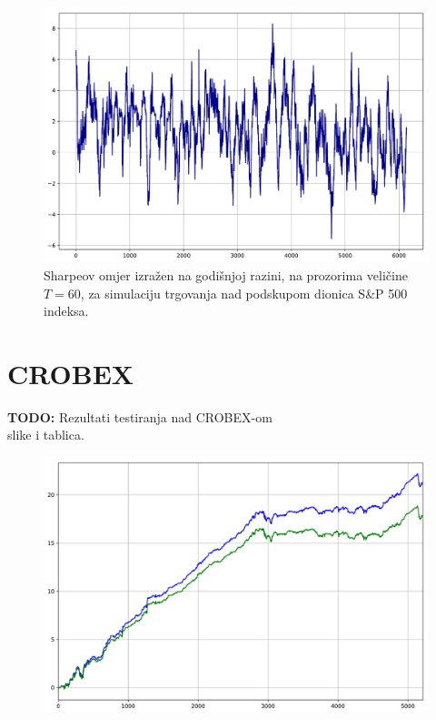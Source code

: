 \documentclass[lmodern, utf8, diplomski, numeric]{fer}
\newcommand{\todo}{\textbf{TODO: }}
\begin{document}
  \begin{figure}[p]
    \centering
    \includegraphics[width=\linewidth]{graphics/sharpe1.pdf}
    \caption{Sharpeov omjer izražen na godišnjoj razini, na prozorima veličine $T = 60$, za simulaciju trgovanja nad podskupom dionica S\&P 500 indeksa.}
    \label{fig:sharpe2}
  \end{figure}

  
  \pagebreak

  \section{CROBEX}
  \todo
  Rezultati testiranja nad CROBEX-om \\
  slike i tablica.

  \begin{figure}[p]
    \centering
    \includegraphics[width=\linewidth]{graphics/results2.pdf}
    \caption{}
    \label{fig:results3}
  \end{figure}
  
\end{document}

